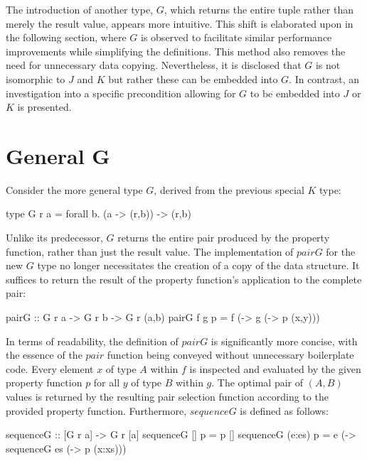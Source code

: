 \documentclass[runningheads]{llncs}
\begin{document}
\qquad The introduction of another type, \(G\), which returns the entire
tuple rather than merely the result value, appears more intuitive. This
shift is elaborated upon in the following section, where \(G\) is
observed to facilitate similar performance improvements while
simplifying the definitions. This method also removes the need for
unnecessary data copying. Nevertheless, it is disclosed that \(G\) is
not isomorphic to \(J\) and \(K\) but rather these can be embedded into
\(G\). In contrast, an investigation into a specific precondition
allowing for \(G\) to be embedded into \(J\) or \(K\) is presented.

\section{General G}\label{general-g}

Consider the more general type \(G\), derived from the previous special
\(K\) type:

\begin{code}
type G r a = forall b. (a -> (r,b)) -> (r,b)
\end{code}

Unlike its predecessor, \(G\) returns the entire pair produced by the
property function, rather than just the result value. The implementation
of \(pairG\) for the new \(G\) type no longer necessitates the creation
of a copy of the data structure. It suffices to return the result of the
property function's application to the complete pair:

\begin{code}
pairG :: G r a -> G r b -> G r (a,b)
pairG f g p = f (\x -> g (\y -> p (x,y)))
\end{code}

In terms of readability, the definition of \(pairG\) is significantly
more concise, with the essence of the \(pair\) function being conveyed
without unnecessary boilerplate code. Every element \(x\) of type \(A\)
within \(f\) is inspected and evaluated by the given property function
\(p\) for all \(y\) of type \(B\) within \(g\). The optimal pair of
\((A,B)\) values is returned by the resulting pair selection function
according to the provided property function. Furthermore, \(sequenceG\)
is defined as follows:

\begin{code}
sequenceG :: [G r a] -> G r [a]
sequenceG [] p     = p []
sequenceG (e:es) p = e (\x  -> sequenceG es 
                       (\xs -> p (x:xs)))
\end{code}
\end{document}
